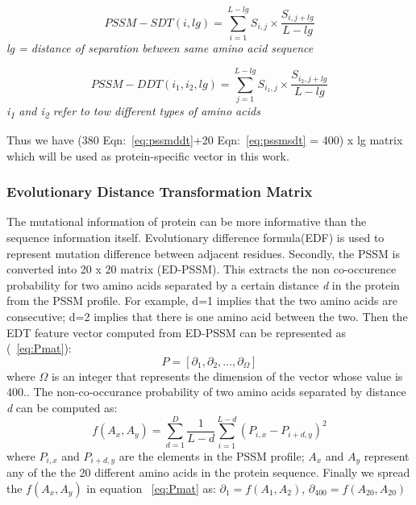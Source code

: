 \begin{equation}
  PSSM-SDT(i,lg) = \sum_{i=1}^{L-lg} S_{i,j} \times \frac{ S_{i,j+lg} }{L-lg} 
  \label{eq:pssmsdt}
\end{equation}
\textit{\center lg =  distance of separation between same amino acid sequence}

\begin{equation}
  PSSM-DDT(i_1,i_2, lg) = \sum_{j=1}^{L-lg} S_{i_1,j} \times \frac{ S_{i_2,j+lg} }{ L-lg} 
  \label{eq:pssmddt}
\end{equation}
\textit{\centering i\textsubscript{1} and i\textsubscript{2} refer to tow different types of amino acids}

Thus we have (380 Eqn:~\ref{eq:pssmddt}+20 Eqn:~\ref{eq:pssmsdt} = 400) x lg matrix which will be used as protein-specific vector in this work.

\subsubsection{Evolutionary Distance Transformation Matrix}
The mutational information of protein can be more informative than the sequence information itself\cite{Zhang2014}. Evolutionary difference formula(EDF) is used to represent mutation difference between adjacent residues. Secondly, the PSSM is converted into 20 x 20 matrix (ED-PSSM). This extracts the non co-occurence probability for two amino acids separated by a certain distance \textit{d} in the protein from the PSSM profile. For example, d=1 implies that the two amino acids are consecutive; d=2 implies that there is one amino acid between the two. Then the EDT feature vector computed from ED-PSSM can be represented as (~\ref{eq:Pmat}): 
\begin{equation}
  \label{eq:Pmat}
  P = [ \partial_1 ,\partial_2, \dots, \partial_\Omega]
\end{equation}
where $\Omega$ is an integer that represents the dimension of the vector whose value is 400.. The non-co-occurance probability of two amino acids separated by distance \textit{d} can be computed as:
\begin{equation}
  f(A_x,A_y) = \sum_{d=1}^{D} \frac{1}{L-d} \sum_{i=1}^{L-d} (P_{i,x} - P_{i+d,y})^2
\end{equation}
where $P_{i,x}$ and $P_{i+d,y}$ are the elements in the PSSM profile; $A_x$ and $A_y$ represent any of the the 20 different amino acids in the protein sequence. Finally we spread the $f(A_x,A_y)$ in equation ~\ref{eq:Pmat} as:
$ \partial_1 = f(A_1,A_2) $, 
$ \partial_{400} = f(A_20, A_20) $


